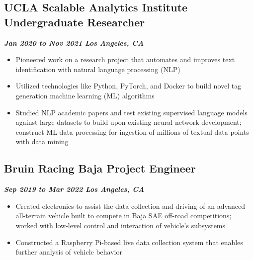 \documentclass[10pt]{article}
\begin{document}
\begin{raggedright}
        \subsection*{\textbf{\large{UCLA Scalable Analytics Institute \textendash{} Undergraduate Researcher}}} \hfill \textbf{\textit{Jan 2020 to Nov 2021 \textendash{} Los Angeles, CA}}
        \begin{itemize}
            \item Pioneered work on a research project that automates and improves text identification with natural language processing (NLP)
            \item Utilized technologies like Python, PyTorch, and Docker to build novel tag generation machine learning (ML) algorithms
            \item Studied NLP academic papers and test existing supervised language models against large datasets to build upon existing neural network development; construct ML data processing for ingestion of millions of textual data points with data mining
        \end{itemize}

        \subsection*{\textbf{\large{Bruin Racing Baja \textendash{} Project Engineer}}} \hfill \textbf{\textit{Sep 2019 to Mar 2022 \textendash{} Los Angeles, CA}}
        \begin{itemize}
            \item Created electronics to assist the data collection and driving of an advanced all-terrain vehicle built to compete in Baja SAE off-road competitions; worked with low-level control and interaction of vehicle’s subsystems
            \item Constructed a Raspberry Pi-based live data collection system that enables further analysis of vehicle behavior
        \end{itemize}

    \end{raggedright}
\end{document}
